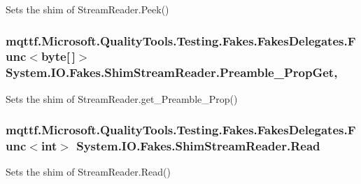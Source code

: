 Sets the shim of Stream\-Reader.\-Peek()

\hypertarget{class_system_1_1_i_o_1_1_fakes_1_1_shim_stream_reader_a43bc1b0d79f4b39ecee42d94a5c380ee}{
\subsubsection[{Preamble\-\_\-\-Prop\-Get}]{\setlength{\rightskip}{0pt plus 5cm}mqttf.\-Microsoft.\-Quality\-Tools.\-Testing.\-Fakes.\-Fakes\-Delegates.\-Func$<$byte\mbox{[}$\,$\mbox{]}$>$ System.\-I\-O.\-Fakes.\-Shim\-Stream\-Reader.\-Preamble\-\_\-\-Prop\-Get\hspace{0.3cm}{\ttfamily [get]}, {\ttfamily [set]}}}\label{class_system_1_1_i_o_1_1_fakes_1_1_shim_stream_reader_a43bc1b0d79f4b39ecee42d94a5c380ee}


Sets the shim of Stream\-Reader.\-get\-\_\-\-Preamble\-\_\-\-Prop()

\hypertarget{class_system_1_1_i_o_1_1_fakes_1_1_shim_stream_reader_ae8f14567a420c442ed0d2f62ed6c12e2}{
\subsubsection[{Read}]{\setlength{\rightskip}{0pt plus 5cm}mqttf.\-Microsoft.\-Quality\-Tools.\-Testing.\-Fakes.\-Fakes\-Delegates.\-Func$<$int$>$ System.\-I\-O.\-Fakes.\-Shim\-Stream\-Reader.\-Read\hspace{0.3cm}{\ttfamily [set]}}}\label{class_system_1_1_i_o_1_1_fakes_1_1_shim_stream_reader_ae8f14567a420c442ed0d2f62ed6c12e2}


Sets the shim of Stream\-Reader.\-Read()

